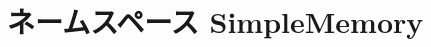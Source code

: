\hypertarget{namespaceSimpleMemory}{
\section{ネームスペース SimpleMemory}
\label{namespaceSimpleMemory}
}
